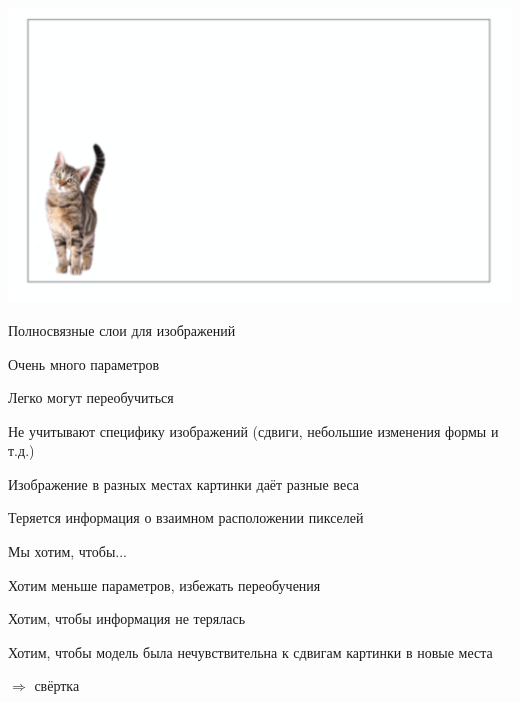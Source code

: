 \documentclass[notes,12pt, aspectratio=169]{beamer}
\newenvironment{wideitemize}{\itemize\addtolength{\itemsep}{10pt}}{\enditemize}
\begin{document}
\begin{frame}
\begin{center}
\includegraphics[width=.7\linewidth]{cat_2.png}
\end{center}
\end{frame}


\begin{frame}{Полносвязные слои для изображений}
\begin{wideitemize}
	\item  Очень много параметров
	\item  Легко могут переобучиться
	\item  Не учитывают специфику изображений (сдвиги, небольшие изменения формы и т.д.)
	\item Изображение в разных местах картинки даёт разные веса
	\item Теряется информация о взаимном расположении пикселей	
\end{wideitemize}
\end{frame}


\begin{frame}{Мы хотим, чтобы...}
\begin{wideitemize}
	\item Хотим меньше параметров, избежать переобучения
	\item Хотим, чтобы информация не терялась
	\item Хотим, чтобы модель была нечувствительна к сдвигам картинки в новые места
\end{wideitemize}

\begin{center}
	{\LARGE  \color{red} $\Rightarrow$   свёртка} 
\end{center}
\end{frame}
\end{document}
